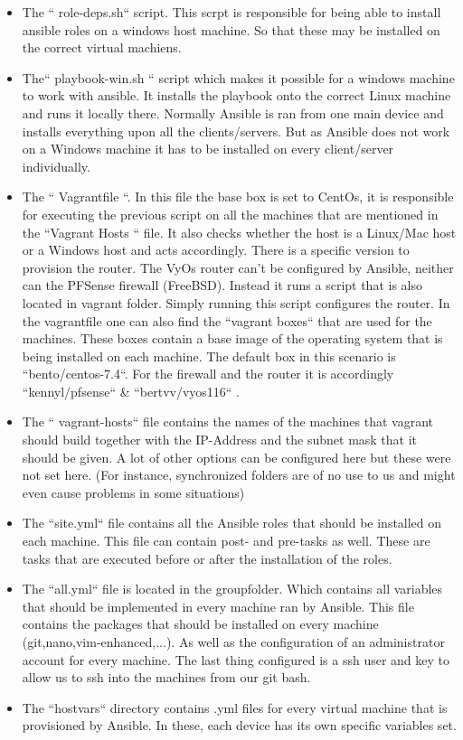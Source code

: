 \begin{itemize}
\item The `` role-deps.sh`` script. This scrpt is responsible for being able to install ansible roles on a windows host machine. So that these may be installed on the correct virtual machiens.
\item The`` playbook-win.sh `` script which makes it possible for a windows machine to work with ansible. It installs the playbook onto the correct Linux machine and runs it locally there. Normally Ansible is ran from one main device and installs everything upon all the clients/servers. But as Ansible does not work on a Windows machine it has to be installed on every client/server individually.
\item The `` Vagrantfile ``. In this file the base box is set to CentOs, it is responsible for executing the previous script on all the machines that are mentioned in the ``Vagrant Hosts `` file. It also checks whether the host is a Linux/Mac host or a Windows host and acts accordingly. There is a specific version to provision the router. The VyOs router can't be configured by Ansible, neither can the PFSense firewall (FreeBSD). Instead it runs a script that is also located in vagrant folder. Simply running this script configures the router. In the vagrantfile one can also find the ``vagrant boxes`` that are used for the machines. These boxes contain a base image of the operating system that is being installed on each machine. The default box in this scenario is ``bento/centos-7.4``. For the firewall and the router it is accordingly ``kennyl/pfsense`` \& ``bertvv/vyos116`` .
\item The `` vagrant-hosts`` file contains the names of the machines that vagrant should build together with the IP-Address and the subnet mask that it should be given. A lot of other options can be configured here but these were not set here. (For instance, synchronized folders are of no use to us and might even cause problems in some situations)
\item The ``site.yml`` file contains all the Ansible roles that should be installed on each machine. This file can contain post- and pre-tasks as well. These are tasks that are executed before or after the installation of the roles.
\item The ``all.yml`` file is located in the group\textunderscore folder. Which contains all variables that should be implemented in every machine ran by Ansible. This file contains the packages that should be installed on every machine (git,nano,vim-enhanced,...). As well as the configuration of an administrator account for every machine. The last thing configured is a ssh user and key to allow us to ssh into the machines from our git bash. 
\item The ``host\textunderscore vars`` directory contains .yml files for every virtual machine that is provisioned by Ansible. In these, each device has its own specific variables set.
\end {itemize}
